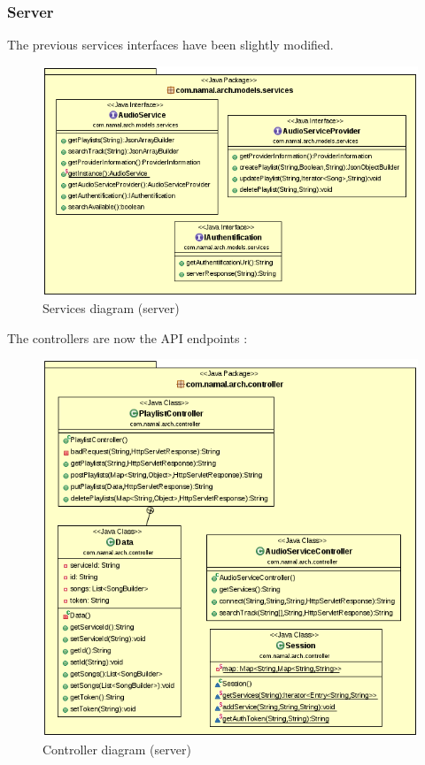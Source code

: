 \documentclass{report}
\begin{document}
{\subsubsection{Server}

The previous services interfaces have been slightly modified. 
\begin{center}
\begin{figure}[H]

  \includegraphics[scale=0.4]{class/servicesServer.png}
  \caption{Services diagram (server)}
  \label{servicesServer}
\end{figure}
\end{center}

The controllers are now the API endpoints :

\begin{center}
\begin{figure}[H]

  \includegraphics[scale=0.4]{class/controllerServer.png}
  \caption{Controller diagram (server)}
  \label{controllerServer}
\end{figure}
\end{center}

}
\end{document}
